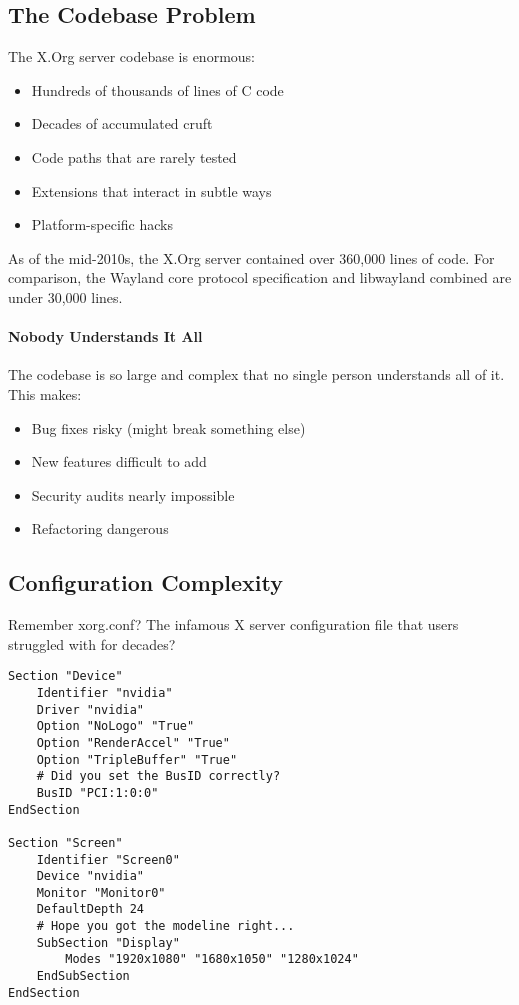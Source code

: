\subsection{The Codebase Problem}

The X.Org server codebase is enormous:

\begin{itemize}
    \item Hundreds of thousands of lines of C code
    \item Decades of accumulated cruft
    \item Code paths that are rarely tested
    \item Extensions that interact in subtle ways
    \item Platform-specific hacks
\end{itemize}

\begin{notebox}
As of the mid-2010s, the X.Org server contained over 360,000 lines of code. For comparison, the Wayland core protocol specification and libwayland combined are under 30,000 lines.
\end{notebox}

\paragraph{Nobody Understands It All}
The codebase is so large and complex that no single person understands all of it. This makes:
\begin{itemize}
    \item Bug fixes risky (might break something else)
    \item New features difficult to add
    \item Security audits nearly impossible
    \item Refactoring dangerous
\end{itemize}

\subsection{Configuration Complexity}

Remember xorg.conf? The infamous X server configuration file that users struggled with for decades?

\begin{lstlisting}[caption=Classic xorg.conf nightmare]
Section "Device"
    Identifier "nvidia"
    Driver "nvidia"
    Option "NoLogo" "True"
    Option "RenderAccel" "True"
    Option "TripleBuffer" "True"
    # Did you set the BusID correctly?
    BusID "PCI:1:0:0"
EndSection

Section "Screen"
    Identifier "Screen0"
    Device "nvidia"
    Monitor "Monitor0"
    DefaultDepth 24
    # Hope you got the modeline right...
    SubSection "Display"
        Modes "1920x1080" "1680x1050" "1280x1024"
    EndSubSection
EndSection
\end{lstlisting}

